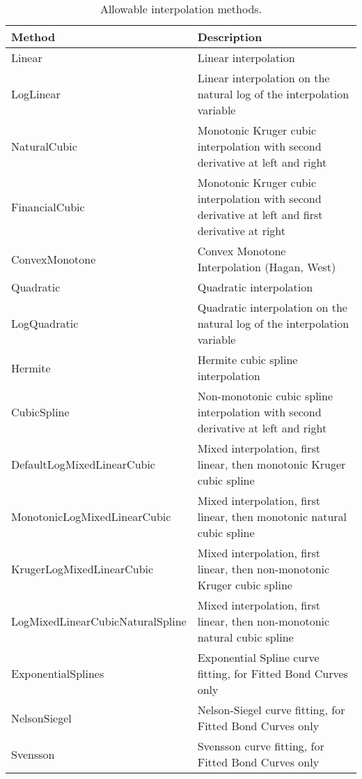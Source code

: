 \begin{table}[h]
\centering
\begin{tabular}{|l|p{11cm}|} 
    \hline
    {\bfseries Method} & {\bfseries Description} \\
    \hline
    Linear & Linear interpolation \\ \hline
    LogLinear & Linear interpolation on the natural log of the interpolation variable \\ \hline
    NaturalCubic & Monotonic Kruger cubic interpolation with second derivative at left and right \\ \hline
    FinancialCubic & Monotonic Kruger cubic interpolation with second derivative at left and 
                     first derivative at right \\ \hline
    ConvexMonotone & Convex Monotone Interpolation (Hagan, West) \\ \hline
    Quadratic & Quadratic interpolation \\ \hline
    LogQuadratic & Quadratic interpolation on the natural log of the interpolation variable \\ \hline
    Hermite & Hermite cubic spline interpolation \\ \hline
    CubicSpline & Non-monotonic cubic spline interpolation with second derivative at left and right \\ \hline
    DefaultLogMixedLinearCubic & Mixed interpolation, first linear, then monotonic Kruger cubic spline \\ \hline
    MonotonicLogMixedLinearCubic & Mixed interpolation, first linear, then monotonic natural cubic spline \\ \hline
    KrugerLogMixedLinearCubic & Mixed interpolation, first linear, then non-monotonic Kruger cubic spline \\ \hline
    LogMixedLinearCubicNaturalSpline & Mixed interpolation, first linear, then non-monotonic natural cubic spline \\ \hline
    ExponentialSplines & Exponential Spline curve fitting, for Fitted Bond Curves only \\ \hline
    NelsonSiegel & Nelson-Siegel curve fitting, for Fitted Bond Curves only \\ \hline
    Svensson & Svensson curve fitting, for Fitted Bond Curves only \\ \hline
  \end{tabular}
  \caption{Allowable interpolation methods.}
  \label{tab:allow_interp_methods}
\end{table}
